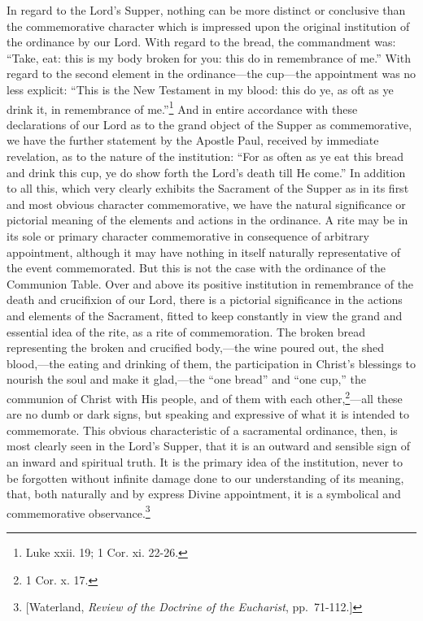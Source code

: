 \documentclass[english,]{book}
\begin{document}
In regard to the Lord's Supper, nothing can be more distinct or conclusive than the commemorative character which is impressed upon the original institution of the ordinance by our Lord. With regard to the bread, the commandment was: ``Take, eat: this is my body broken for you: this do in remembrance of me.'' With regard to the second element in the ordinance---the cup---the appointment was no less explicit: ``This is the New Testament in my blood: this do ye, as oft as ye drink it, in remembrance of me.''\footnote{Luke xxii. 19; 1 Cor. xi. 22-26.} And in entire accordance with these declarations of our Lord as to the grand object of the Supper as commemorative, we have the further statement by the Apostle Paul, received by immediate revelation, as to the nature of the institution: ``For as often as ye eat this bread and drink this cup, ye do show forth the Lord's death till He come.'' In addition to all this, which very clearly exhibits the Sacrament of the Supper as in its first and most obvious character commemorative, we have the natural significance or pictorial meaning of the elements and actions in the ordinance. A rite may be in its sole or primary character commemorative in consequence of arbitrary appointment, although it may have nothing in itself naturally representative of the event commemorated. But this is not the case with the ordinance of the Communion Table. Over and above its positive institution in remembrance of the death and crucifixion of our Lord, there is a pictorial significance in the actions and elements of the Sacrament, fitted to keep constantly in view the grand and essential idea of the rite, as a rite of commemoration. The broken bread representing the broken and crucified body,---the wine poured out, the shed blood,---the eating and drinking of them, the participation in Christ's blessings to nourish the soul and make it glad,---the ``one bread'' and ``one cup,'' the communion of Christ with His people, and of them with each other,\footnote{1 Cor. x. 17.}---all these are no dumb or dark signs, but speaking and expressive of what it is intended to commemorate. This obvious characteristic of a sacramental ordinance, then, is most clearly seen in the Lord's Supper, that it is an outward and sensible sign of an inward and spiritual truth. It is the primary idea of the institution, never to be forgotten without infinite damage done to our understanding of its meaning, that, both naturally and by express Divine appointment, it is a symbolical and commemorative observance.\footnote{{[}Waterland, \emph{Review of the Doctrine of the Eucharist}, pp.~71-112.{]}}
\end{document}
